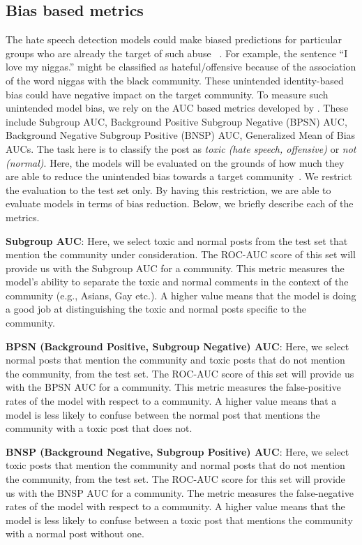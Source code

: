 \documentclass[letterpaper]{article} \usepackage{aaai21}  \usepackage{times}  \usepackage{helvet} \usepackage{courier}  \usepackage[hyphens]{url}  \usepackage{graphicx} \urlstyle{rm} \def\UrlFont{\rm}  \usepackage{natbib}  \usepackage{caption}
\begin{document}
\subsection{Bias based metrics}
The hate speech detection models could make biased predictions for particular groups who are already the target of such abuse
~\cite{sap2019risk,davidson2019racial}. For example, the sentence ``I love my niggas.'' might be classified as hateful/offensive because of the association of the word niggas with the black community. 
These unintended identity-based bias could have negative impact on the target community. To measure such unintended model bias, we rely on the AUC based metrics developed by \citet{borkan2019nuanced}. These include Subgroup AUC, Background Positive Subgroup Negative (BPSN) AUC, Background Negative Subgroup Positive (BNSP) AUC, Generalized Mean of Bias AUCs. The task here is to classify the post as \textit{toxic (hate speech, offensive)} or \textit{not (normal)}. Here, the models will be evaluated on the grounds of how much they are able to reduce the unintended bias towards a target community~\cite{borkan2019nuanced}. We restrict the evaluation to the test set only. By having this restriction, we are able to evaluate models in terms of bias reduction. Below, we briefly describe each of the metrics.

\noindent\textbf{Subgroup AUC}: Here, we select  toxic and normal posts from the test set that mention the community under consideration. The ROC-AUC score of this set will provide us with the Subgroup AUC for a community. This metric measures the model's ability to separate the toxic and normal comments in the context of the community (e.g., Asians, Gay etc.). A higher value means that the model is doing a good job at distinguishing the toxic and normal posts specific to the community.

\noindent\textbf{BPSN (Background Positive, Subgroup Negative) AUC}: Here, we 
select normal posts that mention the community and  toxic posts that do not mention the community, from the test set. The ROC-AUC score of this set will provide us with the BPSN AUC for a community. This metric measures the false-positive rates of the model with respect to a community. A higher value means that a model is less likely to confuse between the normal post that mentions the community with a toxic post that does not.

\noindent\textbf{BNSP (Background Negative, Subgroup Positive) AUC}: Here, we select toxic posts that mention the community and normal posts that do not mention the community, from the test set. The ROC-AUC score for this set will provide us with the BNSP AUC for a community. The metric measures the false-negative rates of the model with respect to a community. A higher value means that the model is less likely to confuse between a toxic post that mentions the community with a normal post without one.
\end{document}
